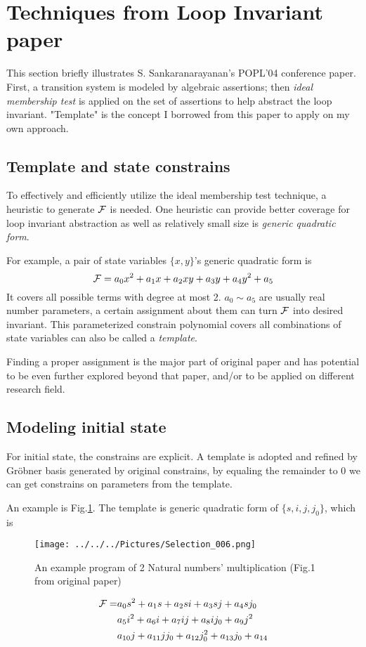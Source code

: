\documentclass[conference,10pt]{IEEEtran}
\begin{document}
\section{Techniques from Loop Invariant paper}
This section briefly illustrates S. Sankaranarayanan's POPL'04 conference paper.
First, a transition system is modeled by algebraic assertions; then \emph{ideal membership test}
is applied on the set of assertions to help abstract the loop invariant. "Template" is the concept
I borrowed from this paper to apply on my own approach.
\subsection{Template and state constrains}
\label{sec:basic}
To effectively and efficiently utilize the ideal membership test technique, a heuristic to
generate ${\mathcal{F}}$ is needed. One heuristic can provide better coverage for loop invariant abstraction as well as
relatively small size is \emph{generic quadratic form}.

For example, a pair of state variables $\{x,y\}$'s generic quadratic form is
$${\mathcal{F}} = a_0x^2+a_1x+a_2xy+a_3y+a_4y^2+a_5$$
It covers all possible terms with degree at most 2. $a_0\sim a_5$ are usually real number parameters,
a certain assignment about them can turn ${\mathcal{F}}$ into desired invariant. This parameterized constrain
polynomial covers all combinations of state variables can also be called a \emph{template}.

Finding a proper assignment is the major part of original paper and has potential to be even further explored
beyond that paper, and/or to be applied on different research field.
\subsection{Modeling initial state}
\label{sec:CKR}
For initial state, the constrains are explicit. A template is adopted and refined by Gr\"obner basis 
generated by original constrains, by equaling the remainder to 0 we can get constrains on
parameters from the template.

An example is Fig.\ref{fig:loopinv}. The template is generic quadratic form of $\{s,i,j,j_0\}$, which is
\begin{figure}[hbt]
	\begin{center}
	\texttt{[image: ../../../Pictures/Selection\_006.png]}
	\end{center}
	\caption{An example program of 2 Natural numbers' multiplication (Fig.1 from original paper)}
	\label{fig:loopinv}
\end{figure}
\begin{align}
{\mathcal{F}} =& a_0s^2+a_1s+a_2si+a_3sj+a_4sj_0\nonumber\\
&a_5i^2+a_6i+a_7ij+a_8ij_0+a_9j^2\nonumber\\
&a_{10}j+a_{11}jj_0+a_{12}j_0^2+a_{13}j_0+a_{14}\nonumber
\end{align}
\end{document}
